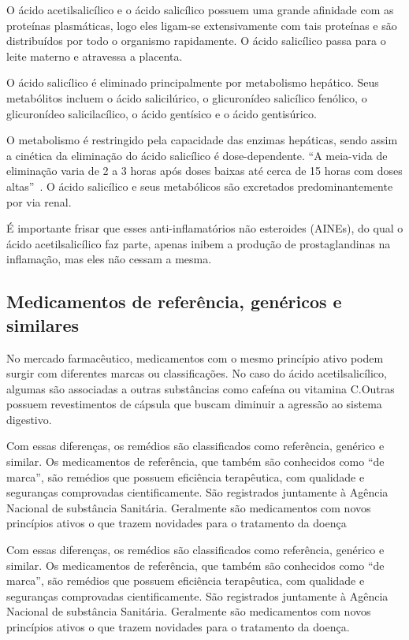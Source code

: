 O ácido acetilsalicílico e o ácido salicílico possuem uma grande afinidade com as proteínas
plasmáticas, logo eles ligam-se extensivamente com tais proteínas e são distribuídos por todo o
organismo rapidamente.  O ácido salicílico passa para o leite materno e atravessa a placenta.

O ácido salicílico é eliminado principalmente por metabolismo hepático. Seus metabólitos incluem o
ácido salicilúrico, o glicuronídeo salicílico fenólico, o glicuronídeo salicilacílico, o ácido
gentísico e o ácido gentisúrico.

O metabolismo é restringido pela capacidade das enzimas hepáticas, sendo assim a cinética da
eliminação do ácido salicílico é dose-dependente. “A meia-vida de eliminação varia de 2 a 3 horas
após doses baixas até cerca de 15 horas com doses altas”~\cite{bulaaspirina}. O ácido salicílico e
seus metabólicos são excretados predominantemente por via renal. 

É importante frisar que esses anti-inflamatórios não esteroides (AINEs), do qual o ácido
acetilsalicílico faz parte, apenas inibem a produção de prostaglandinas na inflamação, mas eles não
cessam a mesma.

\subsection{Medicamentos de referência, genéricos e similares}\label{refgensim}

No mercado farmacêutico, medicamentos com o mesmo princípio ativo podem surgir com diferentes marcas
ou classificações. No caso do ácido acetilsalicílico, algumas são associadas a outras substâncias
como cafeína ou vitamina C.Outras possuem revestimentos de cápsula que buscam diminuir a agressão ao
sistema digestivo.  \cite{prade2006}

Com essas diferenças, os remédios são classificados como referência, genérico e similar. Os
medicamentos de referência, que também são conhecidos como “de marca”, são remédios que possuem
eficiência terapêutica, com qualidade e seguranças comprovadas cientificamente. São registrados
juntamente à Agência Nacional de substância Sanitária. Geralmente são medicamentos com novos
princípios ativos o que trazem novidades para o tratamento da doença

Com essas diferenças, os remédios são classificados como referência, genérico e similar. Os
medicamentos de referência, que também são conhecidos como “de marca”, são remédios que possuem
eficiência terapêutica, com qualidade e seguranças comprovadas cientificamente. São registrados
juntamente à Agência Nacional de substância Sanitária. Geralmente são medicamentos com novos
princípios ativos o que trazem novidades para o tratamento da doença.

